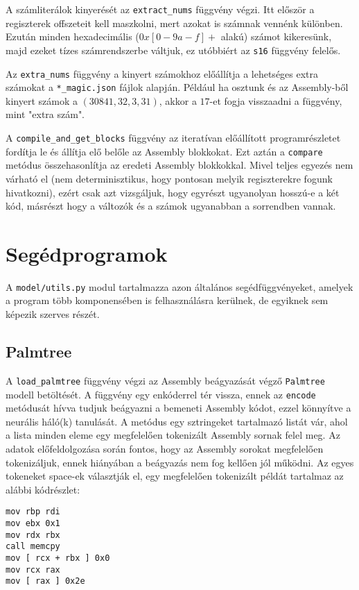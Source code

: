 A számliterálok kinyerését az \texttt{extract\_nums} függvény végzi. Itt először a regiszterek offszeteit kell
maszkolni, mert azokat is számnak vennénk különben. Ezután minden hexadecimális ($0x[0-9a-f]+$ alakú) számot
kikeresünk, majd ezeket tízes számrendszerbe váltjuk, ez utóbbiért az \texttt{s16} függvény felelős.

Az \texttt{extra\_nums} függvény a kinyert számokhoz előállítja a lehetséges extra számokat a \texttt{*\_magic.json}
fájlok alapján. Például ha osztunk és az Assembly-ből kinyert számok a $(30841, 32, 3, 31)$, akkor a $17$-et fogja
visszaadni a függvény, mint "extra szám".

A \texttt{compile\_and\_get\_blocks} függvény az iteratívan előállított programrészletet fordítja le és állítja
elő belőle az Assembly blokkokat. Ezt aztán a \texttt{compare} metódus összehasonlítja az eredeti Assembly blokkokkal.
Mivel teljes egyezés nem várható el (nem determinisztikus, hogy pontosan melyik regiszterekre fogunk hivatkozni),
ezért csak azt vizsgáljuk, hogy egyrészt ugyanolyan hosszú-e a két kód, másrészt hogy a változók és a számok
ugyanabban a sorrendben vannak.


\section{Segédprogramok}

A \texttt{model/utils.py} modul tartalmazza azon általános segédfüggvényeket, amelyek a program
több komponensében is felhasználásra kerülnek, de egyiknek sem képezik szerves részét.

\subsection{Palmtree}
A \texttt{load\_palmtree} függvény végzi az Assembly beágyazását végző \texttt{Palmtree} modell betöltését.
A függvény egy enkóderrel tér vissza, ennek az \texttt{encode} metódusát hívva tudjuk beágyazni a bemeneti
Assembly kódot, ezzel könnyítve a neurális háló(k) tanulását. A metódus egy sztringeket tartalmazó listát vár,
ahol a lista minden eleme egy megfelelően tokenizált Assembly sornak felel meg. Az adatok előfeldolgozása
során fontos, hogy az Assembly sorokat megfelelően tokenizáljuk, ennek hiányában a beágyazás nem fog kellően
jól működni. Az egyes tokeneket space-ek választják el, egy megfelelően tokenizált példát tartalmaz az alábbi
kódrészlet:

\begin{lstlisting}[language={[x86masm]Assembler}]
mov rbp rdi
mov ebx 0x1
mov rdx rbx
call memcpy
mov [ rcx + rbx ] 0x0
mov rcx rax
mov [ rax ] 0x2e
\end{lstlisting}

